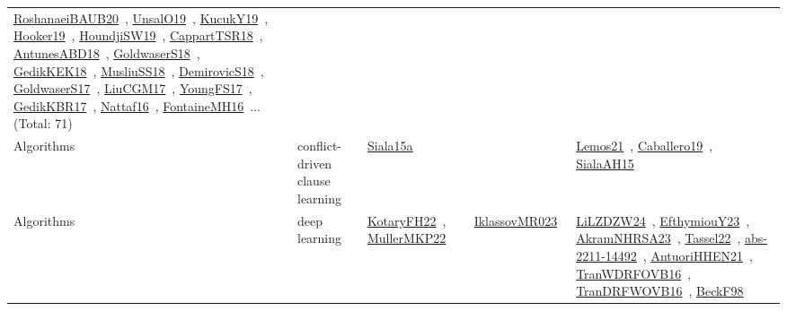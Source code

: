 {\begin{longtable}{lp{3cm}>{\raggedright\arraybackslash}p{6cm}>{\raggedright\arraybackslash}p{6cm}>{\raggedright\arraybackslash}p{8cm}}
\href{../works/RoshanaeiBAUB20.pdf}{RoshanaeiBAUB20}~\cite{RoshanaeiBAUB20}, \href{../works/UnsalO19.pdf}{UnsalO19}~\cite{UnsalO19}, \href{../works/KucukY19.pdf}{KucukY19}~\cite{KucukY19}, \href{../works/Hooker19.pdf}{Hooker19}~\cite{Hooker19}, \href{../works/HoundjiSW19.pdf}{HoundjiSW19}~\cite{HoundjiSW19}, \href{../works/CappartTSR18.pdf}{CappartTSR18}~\cite{CappartTSR18}, \href{../works/AntunesABD18.pdf}{AntunesABD18}~\cite{AntunesABD18}, \href{../works/GoldwaserS18.pdf}{GoldwaserS18}~\cite{GoldwaserS18}, \href{../works/GedikKEK18.pdf}{GedikKEK18}~\cite{GedikKEK18}, \href{../works/MusliuSS18.pdf}{MusliuSS18}~\cite{MusliuSS18}, \href{../works/DemirovicS18.pdf}{DemirovicS18}~\cite{DemirovicS18}, \href{../works/GoldwaserS17.pdf}{GoldwaserS17}~\cite{GoldwaserS17}, \href{../works/LiuCGM17.pdf}{LiuCGM17}~\cite{LiuCGM17}, \href{../works/YoungFS17.pdf}{YoungFS17}~\cite{YoungFS17}, \href{../works/GedikKBR17.pdf}{GedikKBR17}~\cite{GedikKBR17}, \href{../works/Nattaf16.pdf}{Nattaf16}~\cite{Nattaf16}, \href{../works/FontaineMH16.pdf}{FontaineMH16}~\cite{FontaineMH16}... (Total: 71)\\
\index{conflict-driven clause learning}\index{Algorithms!conflict-driven clause learning}Algorithms & conflict-driven clause learning & \href{../works/Siala15a.pdf}{Siala15a}~\cite{Siala15a} &  & \href{../works/Lemos21.pdf}{Lemos21}~\cite{Lemos21}, \href{../works/Caballero19.pdf}{Caballero19}~\cite{Caballero19}, \href{../works/SialaAH15.pdf}{SialaAH15}~\cite{SialaAH15}\\
\index{deep learning}\index{Algorithms!deep learning}Algorithms & deep learning & \href{../works/KotaryFH22.pdf}{KotaryFH22}~\cite{KotaryFH22}, \href{../works/MullerMKP22.pdf}{MullerMKP22}~\cite{MullerMKP22} & \href{../works/IklassovMR023.pdf}{IklassovMR023}~\cite{IklassovMR023} & \href{../works/LiLZDZW24.pdf}{LiLZDZW24}~\cite{LiLZDZW24}, \href{../works/EfthymiouY23.pdf}{EfthymiouY23}~\cite{EfthymiouY23}, \href{../works/AkramNHRSA23.pdf}{AkramNHRSA23}~\cite{AkramNHRSA23}, \href{../works/Tassel22.pdf}{Tassel22}~\cite{Tassel22}, \href{../works/abs-2211-14492.pdf}{abs-2211-14492}~\cite{abs-2211-14492}, \href{../works/AntuoriHHEN21.pdf}{AntuoriHHEN21}~\cite{AntuoriHHEN21}, \href{../works/TranWDRFOVB16.pdf}{TranWDRFOVB16}~\cite{TranWDRFOVB16}, \href{../works/TranDRFWOVB16.pdf}{TranDRFWOVB16}~\cite{TranDRFWOVB16}, \href{../works/BeckF98.pdf}{BeckF98}~\cite{BeckF98}\\

\end{longtable}}

